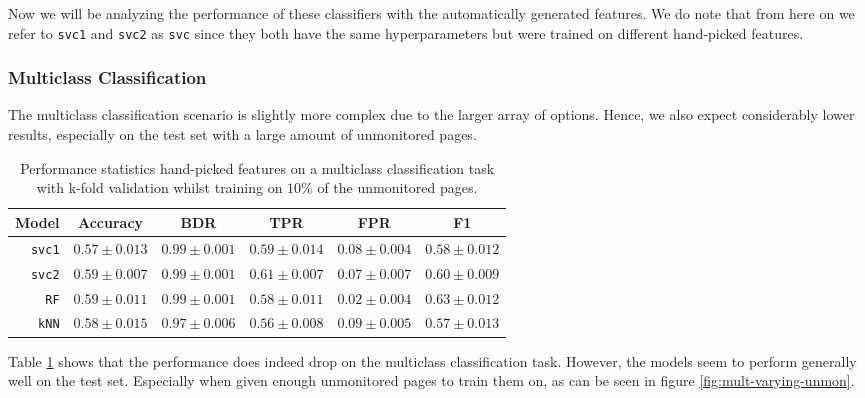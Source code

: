 Now we will be analyzing the performance of these classifiers with the automatically generated features.
We do note that from here on we refer to \texttt{svc1} and \texttt{svc2} as \texttt{svc} since they both have the same hyperparameters but were trained on different hand-picked features.


\subsubsection{Multiclass Classification}

The multiclass classification scenario is slightly more complex due to the larger array of options.
Hence, we also expect considerably lower results, especially on the test set with a large amount of unmonitored pages.

\begin{table}[ht]
  \centering
  \begin{tabular}{ r  r  r  r  r  r } \hline
    \multicolumn{1}{c}{\textbf{Model}} & \multicolumn{1}{c}{\textbf{Accuracy}} & \multicolumn{1}{c}{\textbf{BDR}} & \multicolumn{1}{c}{\textbf{TPR}} &
      \multicolumn{1}{c}{\textbf{FPR}} & \multicolumn{1}{c}{\textbf{F1}} \\ \hline

    \texttt{svc1} & $0.57 \pm 0.013$ & $0.99 \pm 0.001$ & $0.59 \pm 0.014$ & $0.08 \pm 0.004$ & $0.58 \pm 0.012$ \\

    \texttt{svc2} & $0.59 \pm 0.007$ & $0.99 \pm 0.001$ & $0.61 \pm 0.007$ & $0.07 \pm 0.007$ & $0.60 \pm 0.009$ \\

    \texttt{RF} & $0.59 \pm 0.011$ & $0.99 \pm 0.001$ & $0.58 \pm 0.011$ & $0.02 \pm 0.004$ & $0.63 \pm 0.012$\\

    \texttt{kNN} & $0.58 \pm 0.015$ & $0.97 \pm 0.006$ & $0.56 \pm 0.008$ & $0.09 \pm 0.005$ & $0.57 \pm 0.013$ \\

    \hline
  \end{tabular}
  \caption{Performance statistics hand-picked features on a multiclass classification task with k-fold validation whilst training on $10\%$ of the unmonitored pages.}
  \label{table:mult-handpicked-test-error}
\end{table}

Table \ref{table:mult-handpicked-test-error} shows that the performance does indeed drop on the multiclass classification task.
However, the models seem to perform generally well on the test set.
Especially when given enough unmonitored pages to train them on, as can be seen in figure \ref{fig:mult-varying-unmon}.

